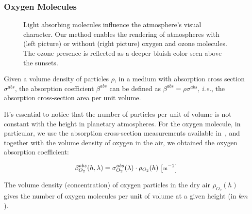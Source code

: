 \documentclass[journal]{vgtc}                %
\begin{document}
\subsubsection{Oxygen Molecules}\label{section:oxygen}

\begin{figure}[t]
  \centering
  \vspace*{-5mm}
  \caption{Light absorbing molecules influence the atmosphere's visual character. Our method enables the rendering of atmospheres with (left picture) or without (right picture) oxygen and ozone molecules. The ozone presence is reflected as a deeper bluish color seen above the sunsets.}
  \label{fig:ozone}
  \vspace*{-3.5mm}  
\end{figure}

Given a volume density of particles $\rho$, in a medium with absorption cross section $\sigma^{abs}$, the absorption coefficient $\beta^{abs}$ can be defined as $\beta^{abs} =\rho\sigma^{abs} $, \textit{i.e.}, the absorption cross-section area per unit volume.

It's essential to notice that the number of particles per unit of volume is not constant with the height in planetary atmospheres.  
For the oxygen molecule, in particular, we use the absorption cross-section measurements available in~\cite{Bogumil:2003}, and together with the volume density of oxygen in the air, we obtained the oxygen absorption coefficient:

\vspace*{-2mm}
\begin{equation} \label{eq:beta-oxygen}   
  \small
  \beta^{abs}_{O_2}(h, \lambda) = \sigma^{abs}_{O_2}(\lambda) \cdot \rho_{O_2}(h)\ \big[\text{m}^{-1}\big]
\end{equation}

The volume density (concentration) of oxygen particles in the dry air $\rho_{O_2}(h)$ gives the number of oxygen molecules per unit of volume at a given height (in $km$).
\end{document}
